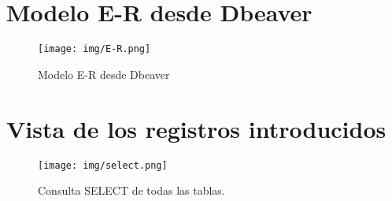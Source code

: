 \documentclass{article}
\begin{document}
  \newpage
    \section{Modelo E-R desde Dbeaver}
      \begin{figure}[h]
        \centering
        \texttt{[image: img/E-R.png]}
        \caption{Modelo E-R desde Dbeaver}
      \end{figure}
  \newpage
    \section{Vista de los registros introducidos}
      \begin{figure}[h]
        \centering
        \texttt{[image: img/select.png]}
        \caption{Consulta SELECT de todas las tablas.}
      \end{figure}

  \newpage
    \listoffigures
\end{document}
